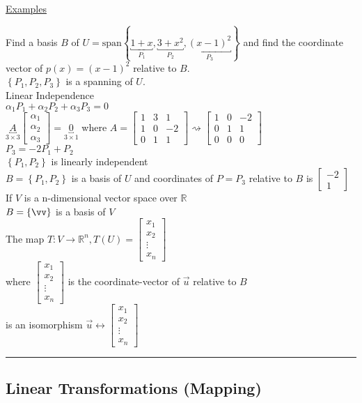 \documentclass[12pt]{article}
\renewcommand{\v}[1]{\overrightarrow{#1}}
\newcommand\m[1]{\begin{bmatrix}#1\end{bmatrix}}
\newcommand{\real}[0]{\mathbb{R}}
\newenvironment{remark}{\block[Remark]}{\endblock}
\newcommand{\uu}[1]{\underbracket{#1}}
\newenvironment{examples}{\shownto{-,compact}\underline{Examples}\enumerate}{\endenumerate\divider\endshownto}
\newcommand{\bb}[1]{\left\{#1\right\}}
\newcommand{\divider}[0]{\par\textcolor{lightgray}{\rule{\textwidth}{0.1pt}}}
\newcommand{\sspan}[1]{\text{span}\bb{#1}}
\begin{document}
\begin{examples}
	\item Find a basis $B$ of $U = \sspan{\uu{1 + x}_{P_1}, \uu{3 + x^2}_{P_2}, \uu{(x - 1)^2}_{P_3}}$ and find the coordinate vector of $p(x) = (x - 1)^2$ relative to $B$. \\
	$\bb{P_1, P_2, P_3}$ is a spanning of $U$. \\
	Linear Independence \\
	$\alpha_1 P_1 + \alpha_2 P_2 + \alpha_3 P_3 = 0$ \\
	$\uu{A}_{3 \times 3} \m{\alpha_1 \\ \alpha_2 \\ \alpha_3} = \uu{0}_{3 \times 1}$ where $A = \m{1 & 3 & 1 \\ 1 & 0 & -2 \\ 0 & 1 & 1} \rightsquigarrow \m{1 & 0 & -2 \\ 0 & 1 & 1 \\ 0 & 0 & 0}$ \\
	$P_3 = -2 P_1 + P_2$ \\
	$\bb{P_1, P_2}$ is linearly independent \\
	$B = \bb{P_1, P_2}$ is a basis of $U$ and coordinates of $P = P_3$ relative to $B$ is $\m{-2 \\ 1}$ \\
	\begin{remark}
		If $V$ is a n-dimensional vector space over $\real$ \\
		$B = \bb{\vv}$ is a basis of $V$ \\
		The map $T: V \rightarrow \real^n, T(U) = \m{x_1 \\ x_2 \\ \vdots \\ x_n}$ \\
		where $\m{x_1 \\ x_2 \\ \vdots \\ x_n}$ is the coordinate-vector of $\v{u}$ relative to $B$ \\
		is an isomorphism $\v{u} \leftrightarrow \m{x_1 \\ x_2 \\ \vdots \\ x_n}$
	\end{remark}
\end{examples}

\subsection{Linear Transformations (Mapping)}
\end{document}
